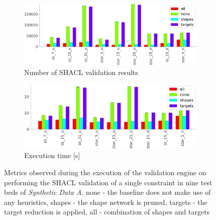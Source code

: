 \begin{figure}
        \centering
        \begin{subfigure}{\linewidth}
            \centering
            \includegraphics[width=\textwidth]{images/evaluation/ablation_study_targets_single.png}
            \caption{Number of SHACL validation results}
            \label{fig:number_of_shacl_validation_results_single}
        \end{subfigure}
        \vspace{0.3cm}
        \begin{subfigure}{\linewidth}
            \centering
             \includegraphics[width=\textwidth]{images/evaluation/ablation_study_shacl_time_single.png}
            \caption{Execution time [s]}
            \label{fig:average_execution_time_shacl_single}
        \end{subfigure} 
        \caption{Metrics observed during the execution of the validation engine on performing the SHACL validation of a single constraint in nine test beds of \textit{Synthetic Data A}. none - the baseline does not make use of any heuristics, shapes - the shape network is pruned, targets - the target reduction is applied, all - combination of shapes and targets}
        \label{fig:metrics_ablation_single}
\end{figure}

